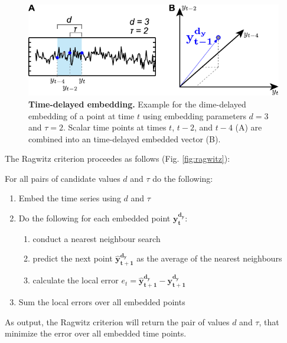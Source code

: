 \documentclass[a4paper,10pt]{article}
\begin{document}
\begin{figure}[H]	
	\centering 
 		\includegraphics{ragwitz_01.pdf}
	\caption[Time-delayed embedding]{\textbf{Time-delayed embedding.} Example for the dime-delayed embedding of a point at time $t$ using embedding parameters $d=3$ and $\tau=2$. Scalar time points at times $t$, $t-2$, and $t-4$ (A) are combined into an time-delayed embedded vector (B).}
	\label{fig:embedding}
\end{figure} 

The Ragwitz criterion proceedes as follows (Fig. \ref{fig:ragwitz}):

For all pairs of candidate values $d$ and $\tau$ do the following:
\begin{enumerate}
 \item Embed the time series using $d$ and $\tau$
 \item Do the following for each embedded point $\mathbf{y_t^{d_y}}$:
 \begin{enumerate}
  \item conduct a nearest neighbour search
  \item predict the next point $\mathbf{\hat{y}_{t+1}^{d_y}}$ as the average of the nearest neighbours
  \item calculate the local error $e_t = \mathbf{\hat{y}_{t+1}^{d_y}} - \mathbf{y_{t+1}^{d_y}}$
 \end{enumerate}
 \item Sum the local errors over all embedded points
\end{enumerate}

As output, the Ragwitz criterion will return the pair of values $d$ and $\tau$, that minimize the error over all embedded time points. 
\end{document}
